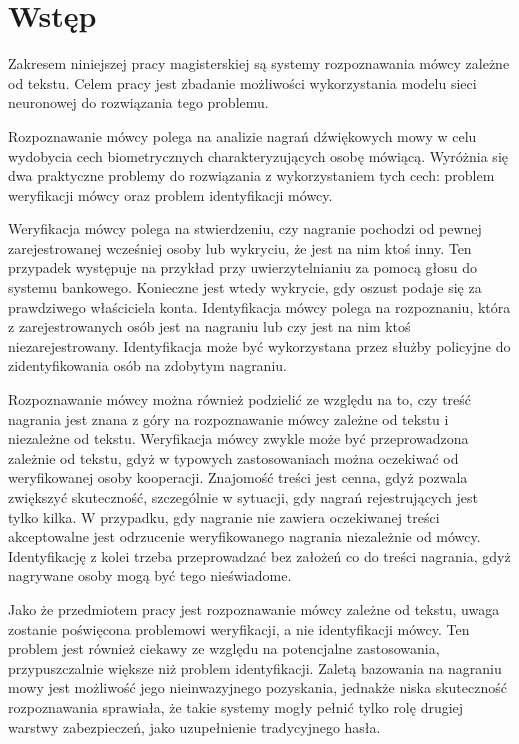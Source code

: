 \chapter{Wstęp}\label{chap:wstep}

Zakresem niniejszej pracy magisterskiej są systemy rozpoznawania mówcy zależne od tekstu. Celem
pracy jest zbadanie możliwości wykorzystania modelu sieci neuronowej do rozwiązania tego problemu. 

Rozpoznawanie mówcy polega na analizie nagrań dźwiękowych mowy w celu wydobycia cech biometrycznych 
charakteryzujących osobę mówiącą. Wyróżnia się dwa praktyczne problemy do rozwiązania z wykorzystaniem tych
cech: problem weryfikacji mówcy oraz problem identyfikacji mówcy. 

Weryfikacja mówcy polega na stwierdzeniu, czy nagranie pochodzi od pewnej zarejestrowanej wcześniej osoby 
lub wykryciu, że jest na nim ktoś inny. Ten przypadek występuje na przykład przy uwierzytelnianiu za pomocą głosu 
do systemu bankowego. Konieczne jest wtedy wykrycie, gdy oszust podaje się za prawdziwego właściciela konta. 
Identyfikacja mówcy polega na rozpoznaniu, która z zarejestrowanych osób jest na nagraniu lub czy 
jest na nim ktoś niezarejestrowany. Identyfikacja może być wykorzystana przez służby policyjne do
zidentyfikowania osób na zdobytym nagraniu.

Rozpoznawanie mówcy można również podzielić ze względu na to, czy treść nagrania jest znana z góry
na rozpoznawanie mówcy zależne od tekstu i niezależne od tekstu. Weryfikacja mówcy zwykle może
być przeprowadzona zależnie od tekstu, gdyż w typowych zastosowaniach można oczekiwać od weryfikowanej
osoby kooperacji. Znajomość treści jest cenna, gdyż pozwala zwiększyć skuteczność, szczególnie w sytuacji, 
gdy nagrań rejestrujących jest tylko kilka. W przypadku, gdy nagranie nie zawiera oczekiwanej treści 
akceptowalne jest odrzucenie weryfikowanego nagrania niezależnie od mówcy. 
Identyfikację z kolei trzeba przeprowadzać bez założeń co do treści nagrania, gdyż nagrywane osoby mogą 
być tego nieświadome.

Jako że przedmiotem pracy jest rozpoznawanie mówcy zależne od tekstu, uwaga zostanie poświęcona problemowi
weryfikacji, a nie identyfikacji mówcy. Ten problem jest również ciekawy ze względu na potencjalne zastosowania,
przypuszczalnie większe niż problem identyfikacji. Zaletą bazowania na nagraniu mowy jest możliwość
jego nieinwazyjnego pozyskania, jednakże niska skuteczność rozpoznawania sprawiała, że takie systemy
mogły pełnić tylko rolę drugiej warstwy zabezpieczeń, jako uzupełnienie tradycyjnego hasła.

